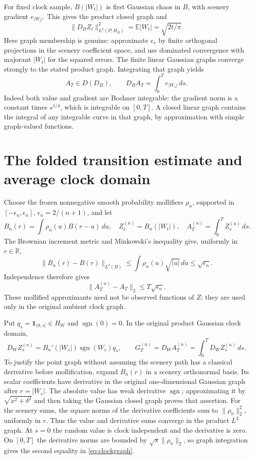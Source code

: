 \documentclass[11pt]{article}
\newcommand{\R}{\mathbb R}\newcommand{\E}{\mathbb E}
\begin{document}
For fixed clock sample, $B(|W_t|)$ is first Gaussian chaos in $B$, with
scenery gradient $e_{|W_t|}$. This gives the product closed graph and
\[
 \|D_BZ_t\|_{L^2(P;H_B)}^2=\E|W_t|=\sqrt{2t/\pi}.
\]
Here graph membership is genuine: approximate $e_r$ by finite orthogonal
projections in the scenery coefficient space, and use dominated
convergence with majorant $|W_t|$ for the squared errors. The finite
linear Gaussian graphs converge strongly to the stated product graph.
Integrating that graph yields
\begin{equation}\label{eq:sourceaverage}
 A_T\in D(D_B),\qquad
 D_BA_T=\int_0^T e_{|W_s|}\,ds.
\end{equation}
Indeed both value and gradient are Bochner integrable: the gradient norm
is a constant times $s^{1/4}$, which is integrable on $[0,T]$.
A closed linear graph contains the integral of any integrable curve
in that graph, by approximation with simple graph-valued functions.

\section{The folded transition estimate and average clock domain}
Choose the frozen nonnegative smooth probability mollifiers $\rho_n$,
supported in $[-\epsilon_n,\epsilon_n]$, $\epsilon_n=2/(n+1)$, and let
\[
 B_n(r)=\int\rho_n(u)B(r-u)\,du,\quad
 Z_t^{(n)}=B_n(|W_t|),\quad A_T^{(n)}=\int_0^T Z_s^{(n)}\,ds.
\]
The Brownian increment metric and Minkowski's inequality give, uniformly
in $r\in\R$,
\[
 \|B_n(r)-B(r)\|_{L^2(B)}
 \leq\int\rho_n(u)\sqrt{|u|}\,du\leq\sqrt{\epsilon_n}.
\]
Independence therefore gives
\begin{equation}\label{eq:averageerror}
 \|A_T^{(n)}-A_T\|_2\leq T\sqrt{\epsilon_n}.
\end{equation}
These mollified approximants need not be observed functions of $Z$;
they are used only in the original ambient clock graph.

Put $q_s=\mathbf1_{(0,s]}\in H_W$ and $\operatorname{sgn}(0)=0$.
In the original product Gaussian clock domain,
\begin{equation}\label{eq:clockgraph}
 D_W Z_s^{(n)}=B_n'(|W_s|)\operatorname{sgn}(W_s)q_s,
 \qquad
 G_T^{(n)}=D_W A_T^{(n)}=\int_0^T D_WZ_s^{(n)}\,ds.
\end{equation}
To justify the point graph without assuming the scenery path has a
classical derivative before mollification, expand $B_n(r)$ in a scenery
orthonormal basis. Its scalar coefficients have derivative in the
original one-dimensional Gaussian graph after $r=|W_s|$. The absolute
value has weak derivative $\operatorname{sgn}$; approximating it by
$\sqrt{x^2+\delta^2}$ and then taking the Gaussian closed graph proves
that assertion. For the scenery sums, the square norms of the derivative
coefficients sum to $\|\rho_n\|_2^2$, uniformly in $r$. Thus the value
and derivative sums converge in the product $L^2$ graph. At $s=0$ the
random value is clock independent and the derivative is zero. On $[0,T]$
the derivative norms are bounded by $\sqrt{s}\|\rho_n\|_2$, so graph
integration gives the second equality in \eqref{eq:clockgraph}.
\end{document}
